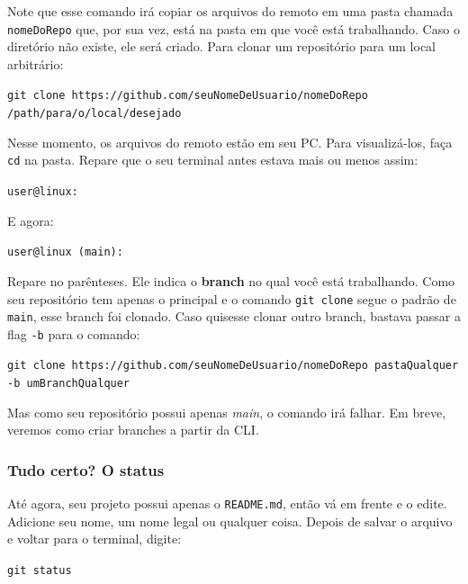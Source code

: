 \documentclass{article}
\begin{document}
  Note que esse comando irá copiar os arquivos do remoto em uma pasta chamada \texttt{nomeDoRepo} que, por sua vez, está na pasta
  em que você está trabalhando. Caso o diretório não existe, ele será criado. Para clonar um repositório para um local arbitrário: 

  \vspace{1ex}
  \texttt{git clone https://github.com/seuNomeDeUsuario/nomeDoRepo /path/para/o/local/desejado}
  \vspace{1ex}

  Nesse momento, os arquivos do remoto estão em seu PC. Para visualizá-los, faça \texttt{cd} na pasta. Repare que o seu terminal 
  antes estava mais ou menos assim:

  \vspace{1ex}
  \texttt{user@linux: ~}
  \vspace{1ex}

  E agora: 

  \vspace{1ex}
  \texttt{user@linux (main): ~}
  \vspace{1ex}

  Repare no parênteses. Ele indica o \textbf{branch} no qual você está trabalhando. Como seu repositório tem apenas o principal e o 
  comando \texttt{git clone} segue o padrão de \texttt{main}, esse branch foi clonado. Caso quisesse clonar outro branch, bastava
  passar a flag \texttt{-b} para o comando: 

  \vspace{1ex}
  \texttt{git clone https://github.com/seuNomeDeUsuario/nomeDoRepo pastaQualquer -b umBranchQualquer}
  \vspace{1ex}

  Mas como seu repositório possui apenas \textit{main}, o comando irá falhar. Em breve, veremos como criar branches a partir da CLI.

  \subsubsection{Tudo certo? O status}

  Até agora, seu projeto possui apenas o \texttt{README.md}, então vá em frente e o edite. Adicione seu nome, um nome legal ou 
  qualquer coisa. Depois de salvar o arquivo e voltar para o terminal, digite: 

  \vspace{1ex}
  \texttt{git status}
  \vspace{1ex}
\end{document}
